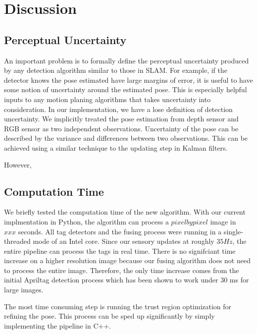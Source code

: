 \section{Discussion}
\label{sec:discussion}
\subsection{Perceptual Uncertainty}
An important problem is to formally define the perceptual uncertainty produced by any detection algorithm similar to those in SLAM. For example, if the detector knows the pose estimated have large margins of error, it is useful to have some notion of uncertainty around the estimated pose. This is especially helpful inputs to any motion planing algorithms that takes uncertainty into consideration. In our implementation, we have a lose definition of detection uncertainty. We implicitly treated the pose estimation from depth sensor and RGB sensor as two independent observations. Uncertainty of the pose can be described by the variance and differences between two observations. This can be achieved using a similar technique to the updating step in Kalman filters.  

However, 
\subsection{Computation Time}
We briefly tested the computation time of the new algorithm. With our current implmentation in Python, the algorithm can process a $pixel by pixel$ image in ~$xxx$ seconds. All tag detectors and the fusing process were running in a single-threaded mode of an Intel core. Since our sensory updates at roughly $35Hz$, the entire pipeline can process the tags in real time. There is no signifciant time increase on a higher resolution image because our fusing algorithm does not need to process the entire image. Therefore, the only time increase comes from the initial Apriltag detection process which has been shown to work under $30$ ms for large images.

The most time consuming step is running the trust region optimization for refining the pose. This process can be sped up significantly by simply implementing the pipeline in C++.